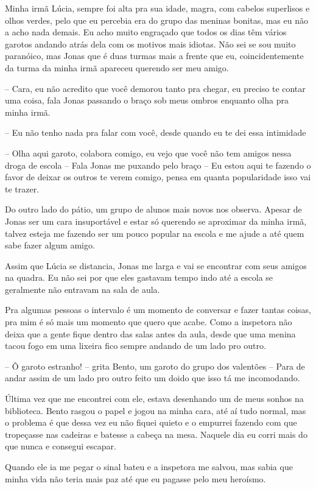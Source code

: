 Minha irmã Lúcia, sempre foi alta pra sua idade, magra, com cabelos superlisos e olhos verdes, pelo que eu percebia era do grupo das meninas bonitas, mas eu não a acho nada demais. Eu acho muito engraçado que todos os dias têm vários garotos andando atrás dela com os motivos mais idiotas. Não sei se sou muito paranóico, mas Jonas que é duas turmas mais a frente que eu, coincidentemente da turma da minha irmã apareceu querendo ser meu amigo.

-- Cara, eu não acredito que você demorou tanto pra chegar, eu preciso te contar uma coisa, fala Jonas passando o braço sob meus ombros enquanto olha pra minha irmã.

-- Eu não tenho nada pra falar com você, desde quando eu te dei essa intimidade

-- Olha aqui garoto, colabora comigo, eu vejo que você não tem amigos nessa droga de escola -- Fala Jonas me puxando pelo braço -- Eu estou aqui te fazendo o favor de deixar os outros te verem comigo, pensa em quanta popularidade isso vai te trazer.

Do outro lado do pátio, um grupo de alunos mais novos nos observa. Apesar de Jonas ser um cara insuportável e estar só querendo se aproximar da minha irmã, talvez esteja me fazendo ser um pouco popular na escola e me ajude a até quem sabe fazer algum amigo.

Assim que Lúcia se distancia, Jonas me larga e vai se encontrar com seus amigos na quadra. Eu não sei por que eles gastavam tempo indo até a escola se geralmente não entravam na sala de aula.

Pra algumas pessoas o intervalo é um momento de conversar e fazer tantas coisas, pra mim é só mais um momento que quero que acabe. Como a inspetora não deixa que a gente fique dentro das salas antes da aula, desde que uma menina tacou fogo em uma lixeira fico sempre andando de um lado pro outro.

-- Ô garoto estranho! -- grita Bento, um garoto do grupo dos valentões -- Para de andar assim de um lado pro outro feito um doido que isso tá me incomodando.

Última vez que me encontrei com ele, estava desenhando um de meus sonhos na biblioteca. Bento rasgou o papel e jogou na minha cara, até aí tudo normal, mas o problema é que dessa vez eu não fiquei quieto e o empurrei fazendo com que tropeçasse nas cadeiras e batesse a cabeça na mesa. Naquele dia eu corri mais do que nunca e consegui escapar. 

Quando ele ia me pegar o sinal bateu e a inspetora me salvou, mas sabia que minha vida não teria mais paz até que eu pagasse pelo meu heroísmo.

